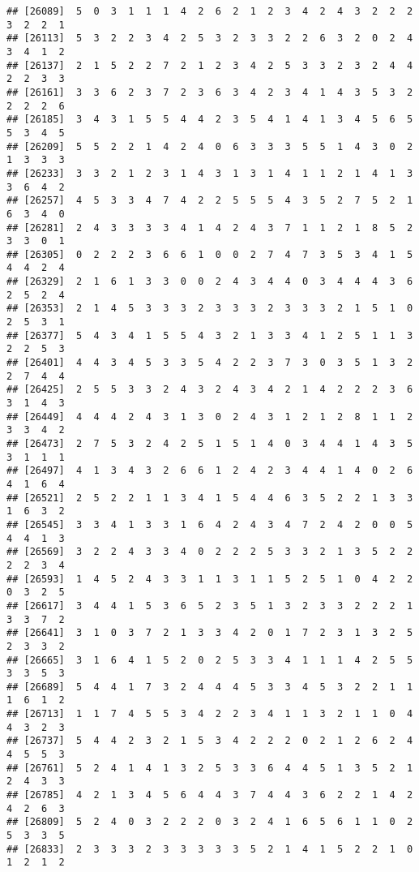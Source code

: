 \documentclass[
]{article}
\begin{document}
\begin{verbatim}
## [26089]  5  0  3  1  1  1  4  2  6  2  1  2  3  4  2  4  3  2  2  2  3  2  2  1
## [26113]  5  3  2  2  3  4  2  5  3  2  3  3  2  2  6  3  2  0  2  4  3  4  1  2
## [26137]  2  1  5  2  2  7  2  1  2  3  4  2  5  3  3  2  3  2  4  4  2  2  3  3
## [26161]  3  3  6  2  3  7  2  3  6  3  4  2  3  4  1  4  3  5  3  2  2  2  2  6
## [26185]  3  4  3  1  5  5  4  4  2  3  5  4  1  4  1  3  4  5  6  5  5  3  4  5
## [26209]  5  5  2  2  1  4  2  4  0  6  3  3  3  5  5  1  4  3  0  2  1  3  3  3
## [26233]  3  3  2  1  2  3  1  4  3  1  3  1  4  1  1  2  1  4  1  3  3  6  4  2
## [26257]  4  5  3  3  4  7  4  2  2  5  5  5  4  3  5  2  7  5  2  1  6  3  4  0
## [26281]  2  4  3  3  3  3  4  1  4  2  4  3  7  1  1  2  1  8  5  2  3  3  0  1
## [26305]  0  2  2  2  3  6  6  1  0  0  2  7  4  7  3  5  3  4  1  5  4  4  2  4
## [26329]  2  1  6  1  3  3  0  0  2  4  3  4  4  0  3  4  4  4  3  6  2  5  2  4
## [26353]  2  1  4  5  3  3  3  2  3  3  3  2  3  3  3  2  1  5  1  0  2  5  3  1
## [26377]  5  4  3  4  1  5  5  4  3  2  1  3  3  4  1  2  5  1  1  3  2  2  5  3
## [26401]  4  4  3  4  5  3  3  5  4  2  2  3  7  3  0  3  5  1  3  2  2  7  4  4
## [26425]  2  5  5  3  3  2  4  3  2  4  3  4  2  1  4  2  2  2  3  6  3  1  4  3
## [26449]  4  4  4  2  4  3  1  3  0  2  4  3  1  2  1  2  8  1  1  2  3  3  4  2
## [26473]  2  7  5  3  2  4  2  5  1  5  1  4  0  3  4  4  1  4  3  5  3  1  1  1
## [26497]  4  1  3  4  3  2  6  6  1  2  4  2  3  4  4  1  4  0  2  6  4  1  6  4
## [26521]  2  5  2  2  1  1  3  4  1  5  4  4  6  3  5  2  2  1  3  3  1  6  3  2
## [26545]  3  3  4  1  3  3  1  6  4  2  4  3  4  7  2  4  2  0  0  5  4  4  1  3
## [26569]  3  2  2  4  3  3  4  0  2  2  2  5  3  3  2  1  3  5  2  2  2  2  3  4
## [26593]  1  4  5  2  4  3  3  1  1  3  1  1  5  2  5  1  0  4  2  2  0  3  2  5
## [26617]  3  4  4  1  5  3  6  5  2  3  5  1  3  2  3  3  2  2  2  1  3  3  7  2
## [26641]  3  1  0  3  7  2  1  3  3  4  2  0  1  7  2  3  1  3  2  5  2  3  3  2
## [26665]  3  1  6  4  1  5  2  0  2  5  3  3  4  1  1  1  4  2  5  5  3  3  5  3
## [26689]  5  4  4  1  7  3  2  4  4  4  5  3  3  4  5  3  2  2  1  1  1  6  1  2
## [26713]  1  1  7  4  5  5  3  4  2  2  3  4  1  1  3  2  1  1  0  4  4  3  2  3
## [26737]  5  4  4  2  3  2  1  5  3  4  2  2  2  0  2  1  2  6  2  4  4  5  5  3
## [26761]  5  2  4  1  4  1  3  2  5  3  3  6  4  4  5  1  3  5  2  1  2  4  3  3
## [26785]  4  2  1  3  4  5  6  4  4  3  7  4  4  3  6  2  2  1  4  2  4  2  6  3
## [26809]  5  2  4  0  3  2  2  2  0  3  2  4  1  6  5  6  1  1  0  2  5  3  3  5
## [26833]  2  3  3  3  2  3  3  3  3  3  5  2  1  4  1  5  2  2  1  0  1  2  1  2

\end{verbatim}
\end{document}
